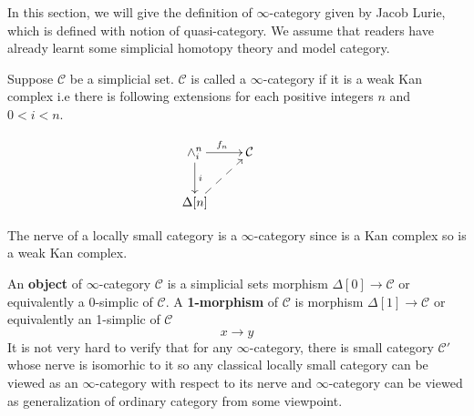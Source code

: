 In this section, we will give the definition of $\infty$-category given by Jacob Lurie, which is defined with notion of quasi-category. We assume that readers have already learnt some simplicial homotopy theory and model category.
\begin{mydefn}
Suppose $\mathcal{C}$ be a simplicial set. $\mathcal{C}$ is called a $\infty$-category if it is a weak Kan complex i.e there is following extensions for each positive integers $n$ and $0<i<n$.

\[
\xymatrix{
\wedge^{n}_{i} \ar[r]^{f_n} \ar[d]^{i}& \mathcal{C}&\\
\Delta[n] \ar@{-->}[ru]&  &
}
\]
\end{mydefn}

\begin{ex}
  The nerve of a locally small category is a $\infty$-category since is a Kan complex so is a weak Kan complex.
\end{ex}
An \textbf{object} of $\infty$-category $\mathcal{C}$ is a simplicial sets morphism $\Delta[0] \rightarrow \mathcal{C}$ or equivalently a 0-simplic of $\mathcal{C}$. A \textbf{1-morphism} of $\mathcal{C}$ is morphism $\Delta[1] \rightarrow \mathcal{C}$ or equivalently an 1-simplic of $\mathcal{C}$
\[
x \rightarrow y
\]
It is not very hard to verify that for any $\infty$-category, there is small category $\mathcal{C}'$ whose nerve is isomorhic to it \citep[see][]{Luri2009} so any classical locally small category can be viewed as an $\infty$-category with respect to its nerve and $\infty$-category can be viewed as generalization of ordinary category from some viewpoint.

